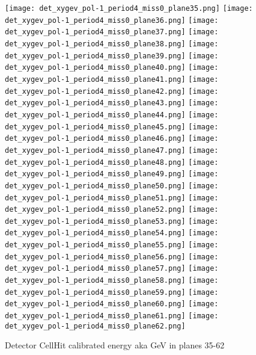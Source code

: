   
        \begin{figure}[h]	   
 \centering
        	\texttt{[image: det\_xygev\_pol-1\_period4\_miss0\_plane35.png]}
	 	\texttt{[image: det\_xygev\_pol-1\_period4\_miss0\_plane36.png]}
		 	\texttt{[image: det\_xygev\_pol-1\_period4\_miss0\_plane37.png]}
			 	\texttt{[image: det\_xygev\_pol-1\_period4\_miss0\_plane38.png]}
				\texttt{[image: det\_xygev\_pol-1\_period4\_miss0\_plane39.png]}	 
        	\texttt{[image: det\_xygev\_pol-1\_period4\_miss0\_plane40.png]}
	 	\texttt{[image: det\_xygev\_pol-1\_period4\_miss0\_plane41.png]}
		 	\texttt{[image: det\_xygev\_pol-1\_period4\_miss0\_plane42.png]}
			 	\texttt{[image: det\_xygev\_pol-1\_period4\_miss0\_plane43.png]}
				\texttt{[image: det\_xygev\_pol-1\_period4\_miss0\_plane44.png]}					
        	\texttt{[image: det\_xygev\_pol-1\_period4\_miss0\_plane45.png]}
	 	\texttt{[image: det\_xygev\_pol-1\_period4\_miss0\_plane46.png]}
		 	\texttt{[image: det\_xygev\_pol-1\_period4\_miss0\_plane47.png]}
			 	\texttt{[image: det\_xygev\_pol-1\_period4\_miss0\_plane48.png]}
				\texttt{[image: det\_xygev\_pol-1\_period4\_miss0\_plane49.png]}
        	\texttt{[image: det\_xygev\_pol-1\_period4\_miss0\_plane50.png]}
	 	\texttt{[image: det\_xygev\_pol-1\_period4\_miss0\_plane51.png]}
		 	\texttt{[image: det\_xygev\_pol-1\_period4\_miss0\_plane52.png]}
			 	\texttt{[image: det\_xygev\_pol-1\_period4\_miss0\_plane53.png]}
				\texttt{[image: det\_xygev\_pol-1\_period4\_miss0\_plane54.png]}
        	\texttt{[image: det\_xygev\_pol-1\_period4\_miss0\_plane55.png]}
	 	\texttt{[image: det\_xygev\_pol-1\_period4\_miss0\_plane56.png]}
		 	\texttt{[image: det\_xygev\_pol-1\_period4\_miss0\_plane57.png]}
			 	\texttt{[image: det\_xygev\_pol-1\_period4\_miss0\_plane58.png]}
				\texttt{[image: det\_xygev\_pol-1\_period4\_miss0\_plane59.png]}
        	\texttt{[image: det\_xygev\_pol-1\_period4\_miss0\_plane60.png]}
	 	\texttt{[image: det\_xygev\_pol-1\_period4\_miss0\_plane61.png]}
		 	\texttt{[image: det\_xygev\_pol-1\_period4\_miss0\_plane62.png]}
\caption{Detector CellHit calibrated energy aka GeV in planes 35-62}			
   \label{fig_detxgev_last}
  \end{figure}

